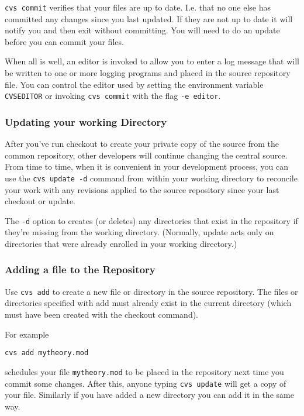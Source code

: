 {\tt cvs commit} verifies that your files are up to date.
      I.e. that no one else has committed any changes since you last
      updated.  If they are not up to date it will notify you and then 
      exit without committing.  You will need to do an update before
      you can commit your files.

When all is well, an editor is invoked to allow you  to
          enter a log message that will be written to one or more
          logging programs and placed in  the  source  repository
          file.  You can control the editor used by setting the
      environment variable {\tt CVSEDITOR} or invoking
      {\tt cvs commit} with the flag {\tt -e editor}.

\subsubsection{Updating your working Directory}
 After you've run checkout to create your  private  copy
          of  the source from the common repository, other developers
          will continue changing the central source.   From  time
          to time, when it is convenient in your development process,
    you can use the {\tt cvs update -d} command from  within  your
          working directory to reconcile your work with any revisions
    applied to  the source repository since your last 
          checkout or update.

The {\tt -d}  option to creates (or deletes)
any directories
      that  exist 
          in  the  repository if they're missing from the working
          directory.  (Normally, update acts only on  directories
          that  were already enrolled in your working
          directory.)


\subsubsection{Adding a file to the Repository}
Use {\tt cvs add} to create a new file  or   directory
          in  the  source  repository.   The files or directories
          specified with add must already exist  in  the  current
          directory  (which  must  have  been  created  with  the
          checkout  command). 

For example
\begin{verbatim}
cvs add mytheory.mod
\end{verbatim} schedules your
    file {\tt mytheory.mod} to be placed in the repository
    next time you commit some changes.  After this, anyone typing
    {\tt cvs update} will get a copy of your file.  Similarly if you have
    added a new directory you can add it in the same way.

